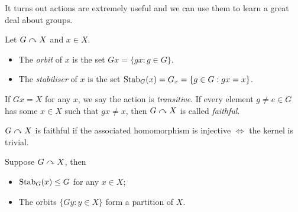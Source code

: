 \documentclass{../template/note}
\begin{document}
    It turns out actions are extremely useful and we can use them to learn a great deal about groups.

    \begin{definition}
        Let \(G \curvearrowright X\) and \(x \in X\).
        \begin{itemize}
            \item The \emph{orbit} of \(x\) is the set \(Gx = \{gx: g \in G\}\).
            \item The \emph{stabiliser} of \(x\) is the set \(\operatorname{Stab}_G(x) = G_x = \{g \in G: gx = x\}\).
        \end{itemize}
        If \(Gx = X\) for any \(x\), we say the action is \emph{transitive}. If every element \(g \neq e \in G\) has some \(x \in X\) such that \(gx \neq x\), then \(G \curvearrowright X\) is called \emph{faithful}.
    \end{definition}
    
    \begin{remark*}
        \(G \curvearrowright X\) is faithful if the associated homomorphism is injective \(\iff\) the kernel is trivial.
    \end{remark*}

    
    \begin{proposition}
        Suppose \(G \curvearrowright X\), then
        \begin{itemize}
            \item \(\operatorname{Stab}_G(x) \leq G\) for any \(x \in X\);
            \item The orbits \(\{Gy: y \in X\}\) form a partition of \(X\).
        \end{itemize}
        \label{stab-subgroup-orbits-partition}
    \end{proposition}
    
\end{document}

